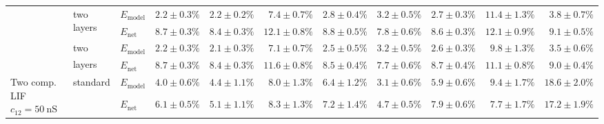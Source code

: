 \begin{sidewaystable}
\begin{tabular}{p{2.2cm} p{1.7cm} l r r r r r r r r }
	\\\cmidrule(l){2-11}
	&
	\multirow{2}{1.7cm}{\raggedleft two layers} &
	$E_\mathrm{model}$ & 
	\color{Gray}$2.2 \pm 0.3\%$ & \color{Gray}$2.2 \pm 0.2\%$ & \color{Gray}$7.4 \pm 0.7\%$ & \color{Gray}$2.8 \pm 0.4\%$ & \color{Gray}$3.2 \pm 0.5\%$ & \color{Gray}$2.7 \pm 0.3\%$ & \color{Gray}$11.4 \pm 1.3\%$ & \color{Gray}$3.8 \pm 0.7\%$
	\\
	& & 
	$E_\mathrm{net}$ &
	\cellcolor{White!38!SteelBlue}$8.7 \pm 0.3\%$ & \cellcolor{White!32!SteelBlue}$8.4 \pm 0.3\%$ & \cellcolor{White!19!SteelBlue}$12.1 \pm 0.8\%$ & \cellcolor{White!50!SteelBlue}$8.8 \pm 0.5\%$ & \cellcolor{White!69!SteelBlue}$7.8 \pm 0.6\%$ & \cellcolor{White!69!SteelBlue}$8.6 \pm 0.3\%$ & \cellcolor{White!19!SteelBlue}$12.1 \pm 0.9\%$ & \cellcolor{White!94!SteelBlue}$9.1 \pm 0.5\%$
	\\\cmidrule(l){2-11}
	&
	\multirow{2}{1.7cm}{\raggedleft two layers\textsuperscript{\dag}} &
	$E_\mathrm{model}$ & 
	\color{Gray}$2.2 \pm 0.3\%$ & \color{Gray}$2.1 \pm 0.3\%$ & \color{Gray}$7.1 \pm 0.7\%$ & \color{Gray}$2.5 \pm 0.5\%$ & \color{Gray}$3.2 \pm 0.5\%$ & \color{Gray}$\mathbf{2.6 \pm 0.3\%}$ & \color{Gray}$9.8 \pm 1.3\%$ & \color{Gray}$\mathbf{3.5 \pm 0.6\%}$
	\\
	& & 
	$E_\mathrm{net}$ &
	\cellcolor{White!32!SteelBlue}$8.7 \pm 0.3\%$ & \cellcolor{White!38!SteelBlue}$8.4 \pm 0.3\%$ & \cellcolor{White!25!SteelBlue}$11.6 \pm 0.8\%$ & \cellcolor{White!63!SteelBlue}$8.5 \pm 0.4\%$ & \cellcolor{White!75!SteelBlue}$7.7 \pm 0.6\%$ & \cellcolor{White!63!SteelBlue}$8.7 \pm 0.4\%$ & \cellcolor{White!38!SteelBlue}$11.1 \pm 0.8\%$ & \cellcolor{White!100!SteelBlue}$\mathbf{9.0 \pm 0.4\%}$
	\\\midrule
	\multirow{8}{2.2cm}{\raggedleft %
	Two comp. LIF $c_{12} = \SI{50}{\nano\siemens}$} &
	\multirow{2}{1.7cm}{\raggedleft %
	standard} &
	$E_\mathrm{model}$ & 
	\color{Gray}$4.0 \pm 0.6\%$ & \color{Gray}$4.4 \pm 1.1\%$ & \color{Gray}$8.0 \pm 1.3\%$ & \color{Gray}$6.4 \pm 1.2\%$ & \color{Gray}$3.1 \pm 0.6\%$ & \color{Gray}$5.9 \pm 0.6\%$ & \color{Gray}$9.4 \pm 1.7\%$ & \color{Gray}$18.6 \pm 2.0\%$
	\\
	& & 
	$E_\mathrm{net}$ &
	\cellcolor{White!82!SteelBlue}$6.1 \pm 0.5\%$ & \cellcolor{White!75!SteelBlue}$5.1 \pm 1.1\%$ & \cellcolor{White!44!SteelBlue}$8.3 \pm 1.3\%$ & \cellcolor{White!82!SteelBlue}$7.2 \pm 1.4\%$ & \cellcolor{White!94!SteelBlue}$4.7 \pm 0.5\%$ & \cellcolor{White!88!SteelBlue}$7.9 \pm 0.6\%$ & \cellcolor{White!75!SteelBlue}$7.7 \pm 1.7\%$ & \cellcolor{White!57!SteelBlue}$17.2 \pm 1.9\%$

\end{tabular}
\end{sidewaystable}
